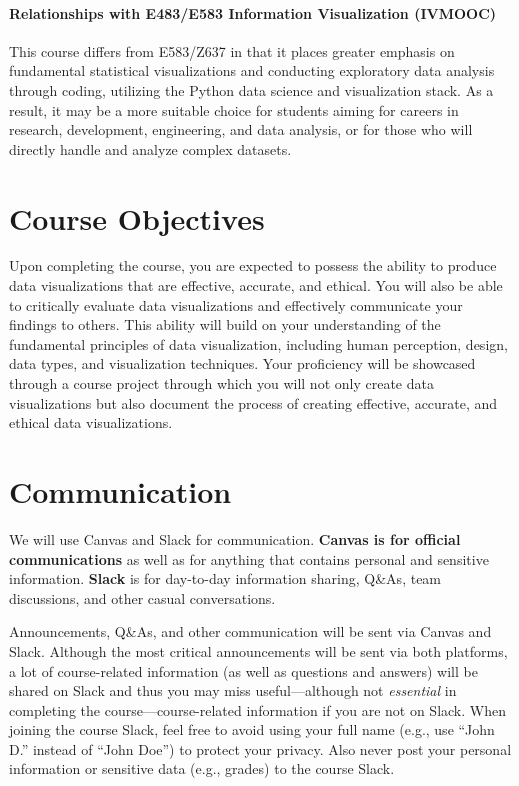 \documentclass[11pt,article,oneside]{memoir} %
\begin{document}
\paragraph{Relationships with E483/E583 Information Visualization (IVMOOC)} This
course differs from E583/Z637 in that it places greater emphasis on fundamental
statistical visualizations and conducting exploratory data analysis through
coding, utilizing the Python data science and visualization stack. As a result,
it may be a more suitable choice for students aiming for careers in research,
development, engineering, and data analysis, or for those who will directly
handle and analyze complex datasets.

\section{Course Objectives}%

Upon completing the course, you are expected to possess the ability to produce
data visualizations that are effective, accurate, and ethical.  You will also be
able to critically evaluate data visualizations and effectively communicate your
findings to others.  This ability will build on your understanding of the
fundamental principles of data visualization, including human perception,
design, data types, and visualization techniques.  Your proficiency will be
showcased through a course project through which you will not only create data
visualizations but also document the process of creating effective, accurate,
and ethical data visualizations.

\section{Communication} %

We will use Canvas and Slack for communication. \textbf{Canvas is for official communications} as well as for anything that contains personal and sensitive information. \textbf{Slack} is for day-to-day information sharing, Q\&As, team discussions, and other casual conversations. 

Announcements, Q\&As, and other communication will be sent via Canvas and Slack. Although the most critical announcements will be sent via both platforms, a lot of course-related information (as well as questions and answers) will be shared on Slack and thus you may miss useful---although not \emph{essential} in completing the course---course-related information if you are not on Slack. 
When joining the course Slack, feel free to avoid using your full name (e.g., use ``John D.'' instead of ``John Doe'') to protect your privacy. 
Also never post your personal information or sensitive data (e.g., grades) to the course Slack. 
\end{document}

